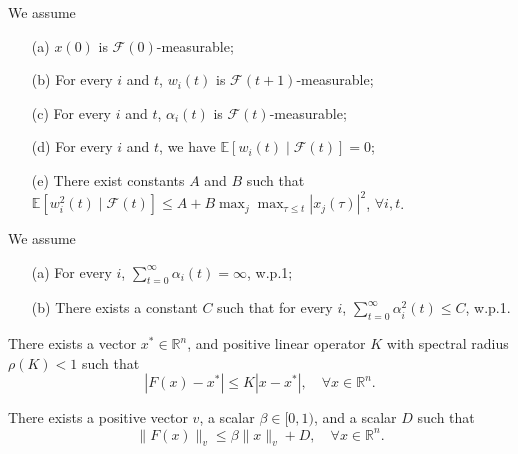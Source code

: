 \begin{assumption}\label{ass:stat2}
We assume
    \begin{enumerate}
\item[(a)] $x(0)$ is $\mathcal{F}(0)$-measurable;
\item[(b)] For every $i$ and $t$, $w_i(t)$ is $\mathcal{F}(t+1)$-measurable;
\item[(c)] For every $i$ and $t$, $\alpha_i(t)$ is $\mathcal{F}(t)$-measurable;
\item[(d)] For every $i$ and $t$, we have $\mathbb{E}[w_i(t) \mid \mathcal{F}(t)] = 0$;
\item[(e)] There exist constants $A$ and $B$ such that
$\mathbb{E}[w_i^2(t) \mid \mathcal{F}(t)] \leq A + B \max_j \max_{\tau \leq t} |x_j(\tau)|^2$, $\forall i, t$.
\end{enumerate}
\end{assumption}
\begin{assumption}\label{ass:stepsize2}
We assume
\begin{enumerate}
\item[(a)] For every $i$, $\sum_{t=0}^{\infty} \alpha_i(t) = \infty$, w.p.1;
\item[(b)] There exists a constant $C$ such that for every $i$, $\sum_{t=0}^{\infty} \alpha_i^2(t) \leq C$, w.p.1.
\end{enumerate}
    
\end{assumption}
\begin{assumption}\label{ass:contraction2}
There exists a vector $x^* \in \mathbb{R}^n$, and positive linear operator $K$ with spectral radius $\rho(K)<1$ such that
\begin{equation}
|F(x) - x^*|\leq K|x - x^*|, \quad \forall x \in \mathbb{R}^n.
\end{equation}
    
\end{assumption}

\begin{assumption}[Boundedness]\label{ass:boundedness2}
    There exists a positive vector $v$, a scalar $\beta \in [0,1)$, and a scalar $D$ such that
\begin{equation}
\|F(x)\|_v \leq \beta\|x\|_v + D, \quad \forall x \in \mathbb{R}^n.
\end{equation}
\end{assumption}

\newpage
